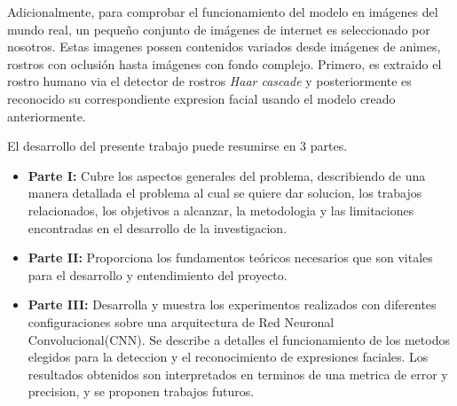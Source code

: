 Adicionalmente, para comprobar el funcionamiento del modelo en imágenes del mundo real, un pequeño conjunto de imágenes de internet es seleccionado por nosotros. Estas imagenes possen contenidos variados desde imágenes de animes, rostros con oclusión hasta imágenes con fondo complejo. Primero, es extraido el rostro humano via el detector de rostros \textit{Haar cascade} y posteriormente es reconocido su correspondiente expresion facial usando el modelo creado anteriormente.

El desarrollo del presente trabajo puede resumirse en 3 partes.

\begin{itemize}
\item \textbf{Parte I:} Cubre los aspectos generales del problema, describiendo de una manera detallada el problema al cual se quiere dar solucion, los trabajos relacionados, los objetivos a alcanzar, la metodologia y las limitaciones encontradas en el desarrollo de la investigacion.
\item \textbf{Parte II:} Proporciona los fundamentos teóricos necesarios que son vitales para el desarrollo y entendimiento del proyecto.
\item \textbf{Parte III:} Desarrolla y muestra los experimentos realizados con diferentes configuraciones sobre una arquitectura de Red Neuronal Convolucional(CNN). Se describe a detalles el funcionamiento de los metodos elegidos para la deteccion y el reconocimiento de expresiones faciales. Los resultados obtenidos son interpretados en terminos de una metrica de error y precision, y se proponen trabajos futuros.


 
 
  
\end{itemize}





